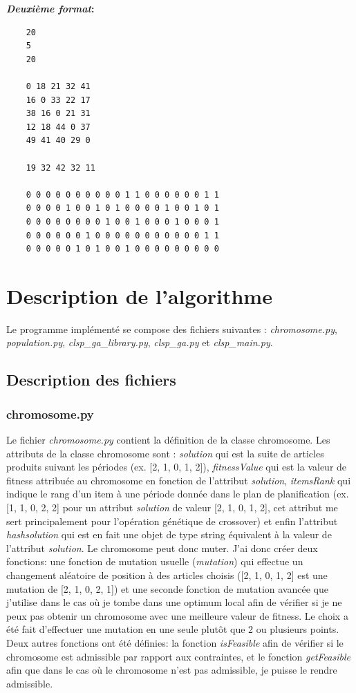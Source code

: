 \documentclass[11pt,a4paper]{article}
\begin{document}
	\textbf{\emph{Deuxième format}:}
	
	\begin{verbatim}
	20
	5
	20

	0 18 21 32 41
	16 0 33 22 17
	38 16 0 21 31
	12 18 44 0 37
	49 41 40 29 0

	19 32 42 32 11

	0 0 0 0 0 0 0 0 0 0 1 1 0 0 0 0 0 0 1 1
	0 0 0 0 1 0 0 1 0 1 0 0 0 0 1 0 0 1 0 1
	0 0 0 0 0 0 0 0 1 0 0 1 0 0 0 1 0 0 0 1
	0 0 0 0 0 0 1 0 0 0 0 0 0 0 0 0 0 0 1 1
	0 0 0 0 0 1 0 1 0 0 1 0 0 0 0 0 0 0 0 0
	\end{verbatim}

\section{Description de l'algorithme}
	Le programme implémenté se compose des fichiers suivantes : \emph{chromosome.py}, \emph{population.py}, \emph{clsp\_ga\_library.py}, \emph{clsp\_ga.py} et \emph{clsp\_main.py}.
	\subsection{Description des fichiers}
	\subsubsection*{chromosome.py}
	Le fichier \emph{chromosome.py} contient la définition de la classe chromosome. Les attributs de la classe chromosome sont : \emph{solution} qui est la suite de articles produits suivant les périodes (ex. [2, 1, 0, 1, 2]), \emph{fitnessValue} qui est la valeur de fitness attribuée au chromosome en fonction de l'attribut \emph{solution}, \emph{itemsRank} qui indique le rang d'un item à une période donnée dans le plan de planification (ex. [1, 1, 0, 2, 2] pour un attribut \emph{solution} de valeur [2, 1, 0, 1, 2], cet attribut me sert principalement pour l'opération génétique de crossover) et enfin l'attribut \emph{hashsolution} qui est en fait une objet de type string équivalent à la valeur de l'attribut \emph{solution}.
	\hspace*{.5cm} Le chromosome peut donc muter. J'ai donc créer deux fonctions: une fonction de mutation usuelle (\emph{mutation}) qui effectue un changement aléatoire de position à des articles choisis ([2, 1, 0, 1, 2] est une mutation de [2, 1, 0, 2, 1]) et une seconde fonction de mutation avancée que j'utilise dans le cas où je tombe dans une optimum local afin de vérifier si je ne peux pas obtenir un chromosome avec une meilleure valeur de fitness. Le choix a été fait d'effectuer une mutation en une seule plutôt que 2 ou plusieurs points. Deux autres fonctions ont été définies: la fonction \emph{isFeasible} afin de vérifier si le chromosome est admissible par rapport aux contraintes, et le fonction \emph{getFeasible} afin que dans le cas où le chromosome n'est pas admissible, je puisse le rendre admissible.
	
\end{document}
